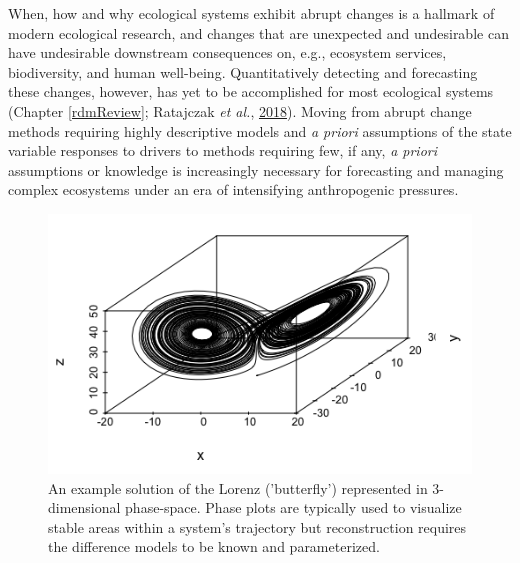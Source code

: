 \documentclass[print]{nuthesis}
\begin{document}
When, how and why ecological systems exhibit abrupt changes is a hallmark of modern ecological research, and changes that are unexpected and undesirable can have undesirable downstream consequences on, e.g., ecosystem services, biodiversity, and human well-being. Quantitatively detecting and forecasting these changes, however, has yet to be accomplished for most ecological systems (Chapter \ref{rdmReview}; Ratajczak \emph{et al.}, \protect\hyperlink{ref-ratajczak2018abrupt}{2018}). Moving from abrupt change methods requiring highly descriptive models and \emph{a priori} assumptions of the state variable responses to drivers to methods requiring few, if any, \emph{a priori} assumptions or knowledge is increasingly necessary for forecasting and managing complex ecosystems under an era of intensifying anthropogenic pressures.
\begin{figure}
\includegraphics[width=0.85\linewidth]{./chapterFiles/velocity/figsCalledInDiss/lorenz3D} \caption{An example solution of the Lorenz ('butterfly') represented in 3-dimensional phase-space. Phase plots are typically used to visualize stable areas within a system's trajectory but reconstruction requires the difference models to be known and parameterized.}\label{fig:lorenz3D}
\end{figure}
\end{document}
